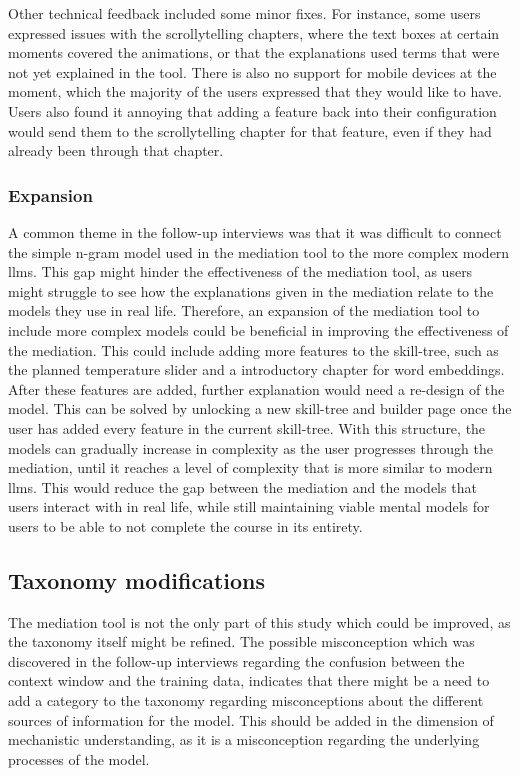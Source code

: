 Other technical feedback included some minor fixes. For instance, some users expressed issues with the scrollytelling chapters, where the text boxes at certain moments covered the animations, or that the explanations used terms that were not yet explained in the tool. There is also no support for mobile devices at the moment, which the majority of the users expressed that they would like to have. Users also found it annoying that adding a feature back into their configuration would send them to the scrollytelling chapter for that feature, even if they had already been through that chapter. 

\subsubsection*{Expansion}
A common theme in the follow-up interviews was that it was difficult to connect the simple n-gram model used in the mediation tool to the more complex modern \gls{llms}. This gap might hinder the effectiveness of the mediation tool, as users might struggle to see how the explanations given in the mediation relate to the models they use in real life. Therefore, an expansion of the mediation tool to include more complex models could be beneficial in improving the effectiveness of the mediation. This could include adding more features to the skill-tree, such as the planned temperature slider and a introductory chapter for word embeddings. After these features are added, further explanation would need a re-design of the model. 
This can be solved by unlocking a new skill-tree and builder page once the user has added every feature in the current skill-tree. With this structure, the models can gradually increase in complexity as the user progresses through the mediation, until it reaches a level of complexity that is more similar to modern \gls{llms}. This would reduce the gap between the mediation and the models that users interact with in real life, while still maintaining viable mental models for users to be able to not complete the course in its entirety.

\subsection*{Taxonomy modifications}
The mediation tool is not the only part of this study which could be improved, as the taxonomy itself might be refined. The possible misconception which was discovered in the follow-up interviews regarding the confusion between the context window and the training data, indicates that there might be a need to add a category to the taxonomy regarding misconceptions about the different sources of information for the model. This should be added in the dimension of mechanistic understanding, as it is a misconception regarding the underlying processes of the model.

